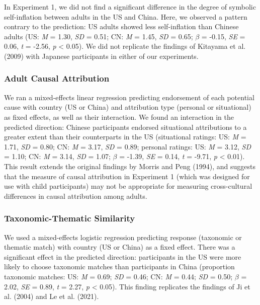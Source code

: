 \documentclass[
  man,floatsintext]{apa6}
\begin{document}
In Experiment 1, we did not find a significant difference in the degree of symbolic self-inflation between adults in the US and China. Here, we observed a pattern contrary to the prediction: US adults showed less self-inflation than Chinese adults (US: \emph{M} = 1.30, \emph{SD} = 0.51; CN: \emph{M} = 1.45, \emph{SD} = 0.65; \(\beta\) = -0.15, \emph{SE} = 0.06, \emph{t} = -2.56, \emph{p} \textless{} 0.05). We did not replicate the findings of Kitayama et al. (2009) with Japanese participants in either of our experiments.

\hypertarget{adult-causal-attribution-1}{%
\subsubsection{Adult Causal Attribution}\label{adult-causal-attribution-1}}

We ran a mixed-effects linear regression predicting endorsement of each potential cause with country (US or China) and attribution type (personal or situational) as fixed effects, as well as their interaction. We found an interaction in the predicted direction: Chinese participants endorsed situational attributions to a greater extent than their counterparts in the US (situational ratings: US: \emph{M} = 1.71, \emph{SD} = 0.80; CN: \emph{M} = 3.17, \emph{SD} = 0.89; personal ratings: US: \emph{M} = 3.12, \emph{SD} = 1.10; CN: \emph{M} = 3.14, \emph{SD} = 1.07; \(\beta\) = -1.39, \emph{SE} = 0.14, \emph{t} = -9.71, \emph{p} \textless{} 0.01). This result extends the original findings by Morris and Peng (1994), and suggests that the measure of causal attribution in Experiment 1 (which was designed for use with child participants) may not be appropriate for measuring cross-cultural differences in causal attribution among adults.

\hypertarget{taxonomic-thematic-similarity-1}{%
\subsubsection{Taxonomic-Thematic Similarity}\label{taxonomic-thematic-similarity-1}}

We used a mixed-effects logistic regression predicting response (taxonomic or thematic match) with country (US or China) as a fixed effect. There was a significant effect in the predicted direction: participants in the US were more likely to choose taxonomic matches than participants in China (proportion taxonomic matches: US: \emph{M} = 0.69; \emph{SD} = 0.46; CN: \emph{M} = 0.44; \emph{SD} = 0.50; \(\beta\) = 2.02, \emph{SE} = 0.89, \emph{t} = 2.27, \emph{p} \textless{} 0.05). This finding replicates the findings of Ji et al. (2004) and Le et al. (2021).
\end{document}
